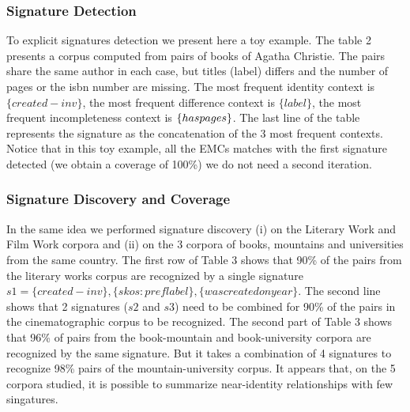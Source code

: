 \documentclass[runningheads]{llncs}
\begin{document}
\subsubsection{Signature Detection}
To explicit signatures detection we present here a toy example. The table 2 presents a corpus computed from pairs of books of Agatha Christie. The pairs share the same author in each case, but titles (label) differs and the number of pages or the isbn number are missing.  
The most frequent identity context is $\{created-inv\}$, the most frequent difference context is $\{label\}$, the most frequent incompleteness context is $\{has\-pages\}$. 
The last line of the table represents the signature as the concatenation of the 3 most frequent contexts. 
Notice that in this toy example, all the EMCs matches with the first signature detected (we obtain a coverage of 100\%) we do not need a second iteration.

\subsubsection{Signature Discovery and Coverage}
In the same idea we performed signature discovery (i) on the Literary Work and Film Work corpora and (ii) on the 3 corpora of books, mountains and universities from the same country. The first row of Table 3 shows that 90\% of the pairs from the literary works corpus are recognized by a single signature $s1=\{created-inv\},\{skos:preflabel\},\{wascreatedonyear\}$. The second line shows that 2 signatures ($s2$ and $s3$) need to be combined for 90\% of the pairs in the cinematographic corpus to be recognized. The second part of Table 3 shows that 96\% of pairs from the book-mountain and book-university corpora are recognized by the same signature. 
But it takes a combination of 4 signatures to recognize 98\% pairs of the mountain-university corpus.
It appears that, on the 5 corpora studied, it is possible to summarize near-identity relationships with few singatures. 
\end{document}
